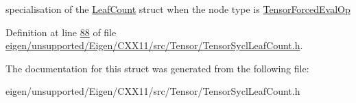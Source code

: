 specialisation of the \hyperlink{struct_eigen_1_1_tensor_sycl_1_1internal_1_1_leaf_count}{Leaf\+Count} struct when the node type is \hyperlink{class_eigen_1_1_tensor_forced_eval_op}{Tensor\+Forced\+Eval\+Op} 

Definition at line \hyperlink{eigen_2unsupported_2_eigen_2_c_x_x11_2src_2_tensor_2_tensor_sycl_leaf_count_8h_source_l00088}{88} of file \hyperlink{eigen_2unsupported_2_eigen_2_c_x_x11_2src_2_tensor_2_tensor_sycl_leaf_count_8h_source}{eigen/unsupported/\+Eigen/\+C\+X\+X11/src/\+Tensor/\+Tensor\+Sycl\+Leaf\+Count.\+h}.



The documentation for this struct was generated from the following file\+:\begin{DoxyCompactItemize}
\item 
eigen/unsupported/\+Eigen/\+C\+X\+X11/src/\+Tensor/\+Tensor\+Sycl\+Leaf\+Count.\+h\end{DoxyCompactItemize}
